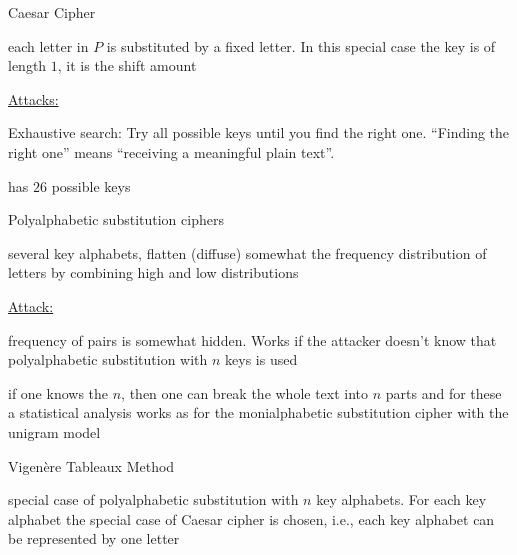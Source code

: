 \documentclass[landscape, a4paper]{article}
\begin{document}
\begin{minipage}[t]{0.198\pagewidth}
\begin{betterlist}
\begin{betterlist}
\begin{betterlist}
			\end{betterlist}
			\begin{betterlist}
				\item \alert{Caesar Cipher}
				\begin{betterlist}
					\item each letter in $P$ is substituted by a fixed letter. In this special case the \alert{key} is of length $1$, it is the shift amount
					\item \underline{Attacks:}
					\begin{betterlist}
						\item \alert{Exhaustive search:} Try all possible keys until you find the right one. \enquote{Finding the right one} means \enquote{receiving a meaningful plain text}.
						\begin{betterlist}
							\item has $26$ possible keys
						\end{betterlist}
					\end{betterlist}
				\end{betterlist}
			\end{betterlist}
		\end{betterlist}
		\begin{betterlist}
			\item \alert{Polyalphabetic substitution ciphers}
			\begin{betterlist}
				\item several key alphabets, flatten (diffuse) somewhat the frequency distribution of letters by combining high and low distributions
				\item \underline{Attack:}
				\begin{betterlist}
					\item frequency of pairs is somewhat hidden. Works if the attacker doesn't know that polyalphabetic substitution with $n$ keys is used
					\item if one knows the $n$, then one can break the whole text into $n$ parts and for these a \alert{statistical analysis} works as for the monialphabetic substitution cipher with the unigram model
				\end{betterlist}
			\end{betterlist}
			\begin{betterlist}
				\item \alert{Vigenère Tableaux Method}
				\begin{betterlist}
					\item special case of polyalphabetic substitution with $n$ key alphabets. For each key alphabet the special case of Caesar cipher is chosen, i.e., each key alphabet can be represented by one letter

\end{betterlist}
\end{betterlist}
\end{betterlist}
\end{betterlist}
\end{minipage}
\end{document}

